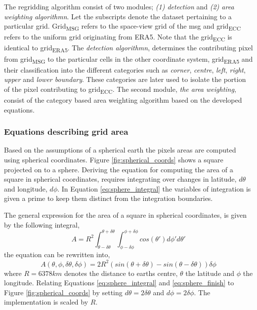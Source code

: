 The regridding algorithm consist of two modules; \textit{(1) detection} and \textit{(2) area weighting algorithmn}. Let the subscripts denote the dataset pertaining to a particular grid. Grid\textsubscript{MSG} refers to the space-view grid of the \acrlong{msg} and grid\textsubscript{ECC} refers to the uniform grid originating from ERA5. Note that the grid\textsubscript{ECC} is identical to  grid\textsubscript{ERA5}. The \textit{detection algorithmn}, determines the contributing pixel from grid\textsubscript{MSG} 
to the particular cells in the other coordinate system,
grid\textsubscript{ERA5} 
and their classification into the different categories such as \textit{corner}, \textit{centre}, \textit{left}, \textit{right}, \textit{upper} and \textit{lower boundary}. These categories are later used to isolate the portion of the pixel contributing to grid\textsubscript{ECC}.
The second module, \textit{the area weighting}, consist of the category based area weighting algorithm based on the developed equations.

\subsubsection{Equations describing grid area}
Based on the assumptions  of a spherical earth the pixels areas are computed using spherical coordinates. Figure \ref{fig:spherical_coords} shows a square projected on to a sphere. Deriving the equation for computing the area of a square in spherical coordinates, requires integrating over changes in latitude, $d\theta$ and longitude, $d\phi$. In Equation \eqref{eq:sphere_integral} the variables of integration is given a prime to keep them distinct from the integration boundaries.

The general expression for the area of a square in spherical coordinates, is given by the following integral,
\begin{equation} \label{eq:sphere_integral}
    A = R^2\int_{ \theta - \delta \theta }^{\theta + \delta \theta} \int_{ \phi - \delta \phi }^{\phi + \delta \phi} cos\left( \theta' \right) d\phi' d\theta'
\end{equation}
the equation can be rewritten into,
\begin{equation} \label{eq:sphere_finish}
    A \left( \theta, \phi, \delta \theta, \delta \phi   \right)= 2R^2 \left( sin\left( \theta + \delta \theta  \right) - sin\left(  \theta - \delta \theta  \right) \right) \delta \phi
\end{equation}
where $R=6378km$ denotes the distance to earths centre, $\theta$ the latitude and $\phi$ the longitude. Relating Equations \eqref{eq:sphere_integral} and \eqref{eq:sphere_finish} to Figure \ref{fig:spherical_coords} by setting $d \theta = 2 \delta \theta$ and $d \phi = 2 \delta \phi$. The implementation is scaled by $R$.

